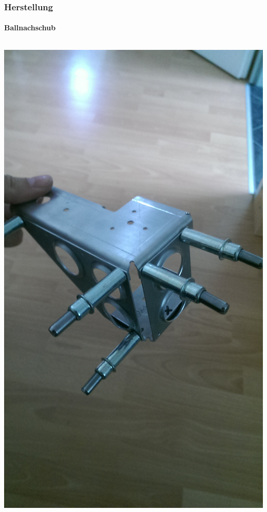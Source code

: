\begin{frame}
    \frametitle{Herstellung}
    \framesubtitle{Ballnachschub}
    \begin{columns}
        \begin{column}{0.9\textwidth}
            \centering
            \includegraphics[width=1.0\textwidth, trim=0 800 0 800, clip=true]{FotosM/Bild4.JPG}
        \end{column}
    \end{columns}
\end{frame}
